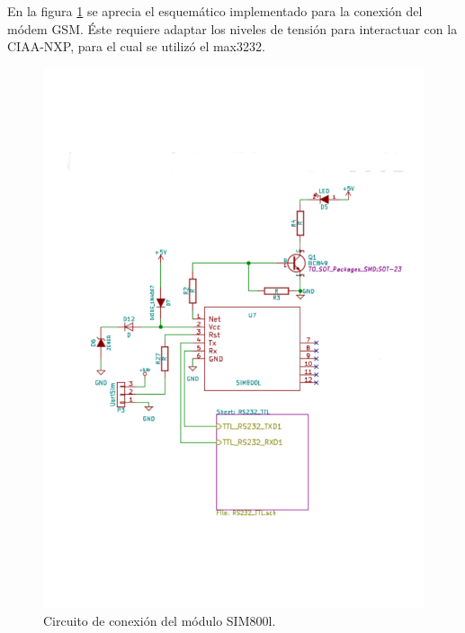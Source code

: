 En la figura \ref{fig:essim800} se aprecia el esquemático implementado para la conexión del módem GSM. Éste requiere adaptar los niveles de tensión para interactuar con la CIAA-NXP, para el cual se utilizó el max3232.
\begin{figure}[!hp]
  \centering
  \includegraphics[page=1,scale=0.5,clip,trim=1cm 4.7cm 1.2cm 6.5cm]{./Figures/sch_modem_sim800.pdf}
  \caption{Circuito de conexión del módulo SIM800l.}
  \label{fig:essim800}
\end{figure}

